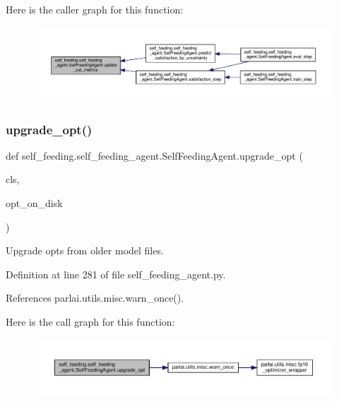 Here is the caller graph for this function\+:
\nopagebreak
\begin{figure}[H]
\begin{center}
\leavevmode
\includegraphics[width=350pt]{classself__feeding_1_1self__feeding__agent_1_1SelfFeedingAgent_a01851e94cd789600609c8aa3c3696241_icgraph}
\end{center}
\end{figure}
\mbox{\label{classself__feeding_1_1self__feeding__agent_1_1SelfFeedingAgent_a5946764aadcca1685cbd228ddf57bdce}} 
\subsubsection{\texorpdfstring{upgrade\+\_\+opt()}{upgrade\_opt()}}
{\footnotesize\ttfamily def self\+\_\+feeding.\+self\+\_\+feeding\+\_\+agent.\+Self\+Feeding\+Agent.\+upgrade\+\_\+opt (\begin{DoxyParamCaption}\item[{}]{cls,  }\item[{}]{opt\+\_\+on\+\_\+disk }\end{DoxyParamCaption})}

\begin{DoxyVerb}Upgrade opts from older model files.\end{DoxyVerb}
 

Definition at line 281 of file self\+\_\+feeding\+\_\+agent.\+py.



References parlai.\+utils.\+misc.\+warn\+\_\+once().

Here is the call graph for this function\+:
\nopagebreak
\begin{figure}[H]
\begin{center}
\leavevmode
\includegraphics[width=350pt]{classself__feeding_1_1self__feeding__agent_1_1SelfFeedingAgent_a5946764aadcca1685cbd228ddf57bdce_cgraph}
\end{center}
\end{figure}


